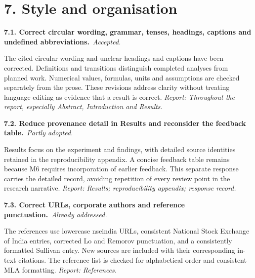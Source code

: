 \documentclass[11pt,a4paper]{article}
\newcommand{\Needspace}[1]{\par\begingroup\ifdim\dimexpr\pagegoal-\pagetotal\relax<#1\relax\newpage\fi\endgroup}
\newcommand{\reply}[3]{\par\addvspace{5pt}\noindent\textbf{#1. #2}\ \textit{#3.}\par\nobreak}
\begin{document}
\Needspace{10\baselineskip}
\section*{7. Style and organisation}
\par\noindent\begin{minipage}{\linewidth}\justifying
\reply{7.1}{Correct circular wording, grammar, tenses, headings, captions and undefined abbreviations.}{Accepted}
The cited circular wording and unclear headings and captions have been corrected. Definitions and transitions distinguish completed analyses from planned work. Numerical values, formulas, units and assumptions are checked separately from the prose. These revisions address clarity without treating language editing as evidence that a result is correct.
{\small\textit{Report: Throughout the report, especially Abstract, Introduction and Results.}}
\end{minipage}\par\addvspace{5pt}

\par\noindent\begin{minipage}{\linewidth}\justifying
\reply{7.2}{Reduce provenance detail in Results and reconsider the feedback table.}{Partly adopted}
Results focus on the experiment and findings, with detailed source identities retained in the reproducibility appendix. A concise feedback table remains because M6 requires incorporation of earlier feedback. This separate response carries the detailed record, avoiding repetition of every review point in the research narrative.
{\small\textit{Report: Results; reproducibility appendix; response record.}}
\end{minipage}\par\addvspace{5pt}

\par\noindent\begin{minipage}{\linewidth}\justifying
\reply{7.3}{Correct URLs, corporate authors and reference punctuation.}{Already addressed}
The references use lowercase nseindia URLs, consistent National Stock Exchange of India entries, corrected Lo and Remorov punctuation, and a consistently formatted Sullivan entry. New sources are included with their corresponding in-text citations. The reference list is checked for alphabetical order and consistent MLA formatting.
{\small\textit{Report: References.}}
\end{minipage}\par\addvspace{5pt}
\end{document}
